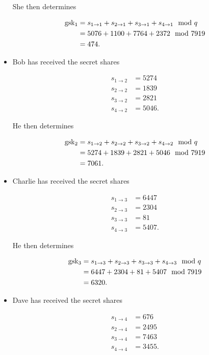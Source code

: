\begin{example}
\begin{itemize}
She then determines

\begin{align}
    \textrm{gsk}{}_{1} &= s_{1\to 1} + s_{2\to 1} + s_{3\to 1} + s_{4\to 1} \mod q
        \nonumber\\
    &= 5076 + 1100 + 7764 + 2372 \mod 7919
        \nonumber\\
    &= 474.
\end{align}

\item Bob has received the secret shares

\begin{align}
    s_{1\to 2} &= 5274 \nonumber\\
    s_{2\to 2} &= 1839 \nonumber\\
    s_{3\to 2} &= 2821 \nonumber\\
    s_{4\to 2} &= 5046.
\end{align}

He then determines

\begin{align}
    \textrm{gsk}{}_{2} &= s_{1\to 2} + s_{2\to 2} + s_{3\to 2} + s_{4\to 2} \mod q
        \nonumber\\
    &= 5274 + 1839 + 2821 + 5046 \mod 7919
        \nonumber\\
    &= 7061.
\end{align}

\item Charlie has received the secret shares

\begin{align}
    s_{1\to 3} &= 6447 \nonumber\\
    s_{2\to 3} &= 2304 \nonumber\\
    s_{3\to 3} &=   81 \nonumber\\
    s_{4\to 3} &= 5407.
\end{align}

He then determines

\begin{align}
    \textrm{gsk}{}_{3} &= s_{1\to 3} + s_{2\to 3} + s_{3\to 3} + s_{4\to 3} \mod q
        \nonumber\\
    &= 6447 + 2304 + 81 + 5407 \mod 7919
        \nonumber\\
    &= 6320.
\end{align}

\item Dave has received the secret shares

\begin{align}
    s_{1\to 4} &=  676 \nonumber\\
    s_{2\to 4} &= 2495 \nonumber\\
    s_{3\to 4} &= 7463 \nonumber\\
    s_{4\to 4} &= 3455.
\end{align}


\end{itemize}
\end{example}
